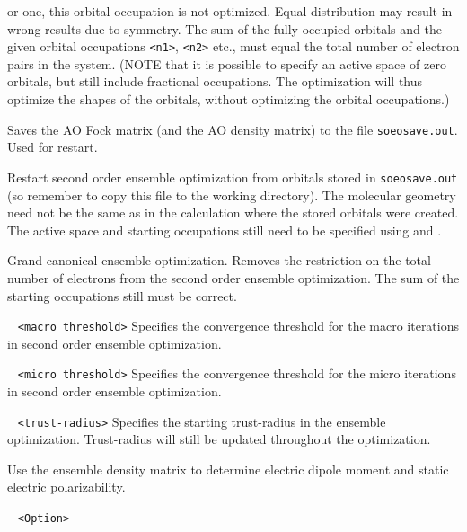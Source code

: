 \begin{description}
or one, this orbital occupation is not optimized. Equal distribution may result in wrong results due to symmetry. The sum of the fully occupied orbitals and 
the given orbital occupations \verb|<n1>|, \verb|<n2>| etc., must equal the total number of electron pairs in the system. (NOTE that it is possible to 
specify an active space of zero orbitals, but still include fractional occupations. The optimization will thus optimize the shapes of the orbitals, without 
optimizing the orbital occupations.)
\item[\Key{SOEOSAVE}] 
Saves the AO Fock matrix (and the AO density matrix) to the file \verb|soeosave.out|. Used for restart.
\item[\Key{SOEORST}] 
Restart second order ensemble optimization from orbitals stored in \verb|soeosave.out| (so remember to copy this file to the working directory). 
The molecular geometry need not be the same as in the calculation 
where the stored orbitals were created. The active space and starting occupations still need to be specified using  and .
\item[\Key{SOEOGC}] 
Grand-canonical ensemble optimization. Removes the restriction on the total number of electrons from the second order ensemble optimization. The sum of the 
starting occupations still must be correct.
\item[\Key{SOEOMATHR}] \verb| | \newline
\verb|<macro threshold>|\newline 
Specifies the convergence threshold for the macro iterations in second order ensemble optimization.
\item[\Key{SOEOMITHR}] \verb| | \newline
\verb|<micro threshold>|\newline 
Specifies the convergence threshold for the micro iterations in second order ensemble optimization.
\item[\Key{SOEOTRUST}] \verb| | \newline
\verb|<trust-radius>|\newline 
Specifies the starting trust-radius in the ensemble optimization. Trust-radius will still be updated throughout the optimization.
\item[\Key{SOEODIPOLE}] Use the ensemble density matrix to determine electric dipole moment and static electric polarizability.
\item[\Key{START}] \verb| | \newline
\verb|<Option>|\newline

\end{description}
